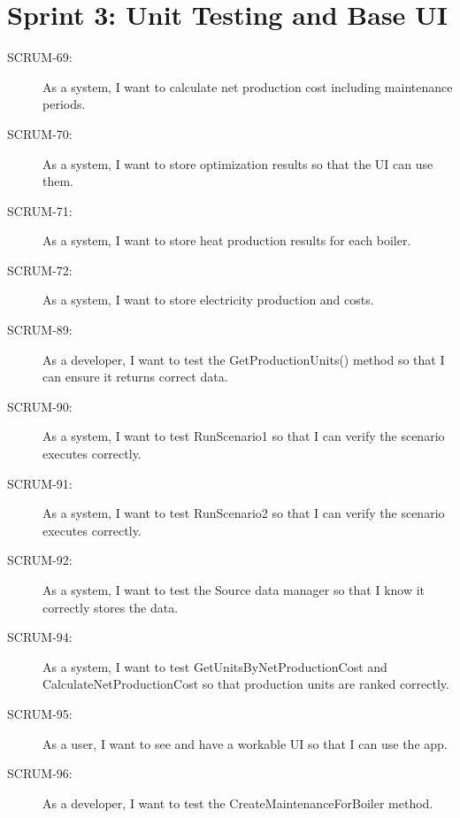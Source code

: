 \section*{Sprint 3: Unit Testing and Base UI}
\begin{description}
    \item[SCRUM-69:] As a system, I want to calculate net production cost including maintenance periods.
    \item[SCRUM-70:] As a system, I want to store optimization results so that the UI can use them.
    \item[SCRUM-71:] As a system, I want to store heat production results for each boiler.
    \item[SCRUM-72:] As a system, I want to store electricity production and costs.
    \item[SCRUM-89:] As a developer, I want to test the GetProductionUnits() method so that I can ensure it returns correct data.
    \item[SCRUM-90:] As a system, I want to test RunScenario1 so that I can verify the scenario executes correctly.
    \item[SCRUM-91:] As a system, I want to test RunScenario2 so that I can verify the scenario executes correctly.
    \item[SCRUM-92:] As a system, I want to test the Source data manager so that I know it correctly stores the data.
    \item[SCRUM-94:] As a system, I want to test GetUnitsByNetProductionCost and CalculateNetProductionCost so that production units are ranked correctly.
    \item[SCRUM-95:] As a user, I want to see and have a workable UI so that I can use the app.
    \item[SCRUM-96:] As a developer, I want to test the CreateMaintenanceForBoiler method.
\end{description}


